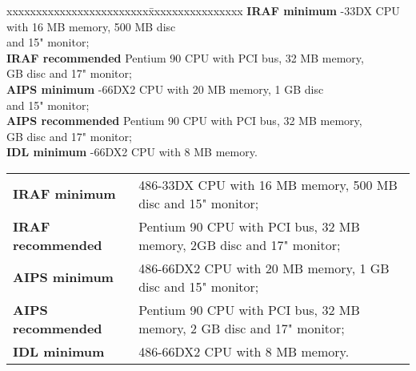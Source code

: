 \documentclass[twoside,11pt]{article}
\newenvironment{latexonly}{}{}
\begin{document}
\begin{latexonly}
\begin{tabbing}
xxxxxxxxxxxxxxxxxxxxxxxx\=xxxxxxxxxxxxxxxx\kill
{\bf IRAF minimum}     -33DX CPU with 16 MB memory, 500 MB disc\\
                       \> and 15" monitor;\\
{\bf IRAF recommended} \> Pentium 90 CPU with PCI bus, 32 MB memory,\\
                        GB disc and 17" monitor;\\
{\bf AIPS minimum}     -66DX2 CPU with 20 MB memory, 1 GB disc\\
                       \> and 15" monitor;\\
{\bf AIPS recommended} \> Pentium 90 CPU with PCI bus, 32 MB memory,\\
                        GB disc and 17" monitor;\\
{\bf IDL minimum}      -66DX2 CPU with 8 MB memory.
\end{tabbing}
\end{latexonly}

\begin{htmlonly}
\begin{tabular}{ll}
{\bf IRAF minimum}     & 486-33DX CPU with 16 MB memory, 500 MB disc and 15" monitor;\\
{\bf IRAF recommended} & Pentium 90 CPU with PCI bus, 32 MB memory, 2GB disc and 17" monitor;\\
{\bf AIPS minimum}     & 486-66DX2 CPU with 20 MB memory, 1 GB disc and 15" monitor;\\
{\bf AIPS recommended} & Pentium 90 CPU with PCI bus, 32 MB memory, 2 GB disc and 17" monitor;\\
{\bf IDL minimum}      & 486-66DX2 CPU with 8 MB memory.
\end{tabular}
\end{htmlonly}
\newpage
\end{document}
